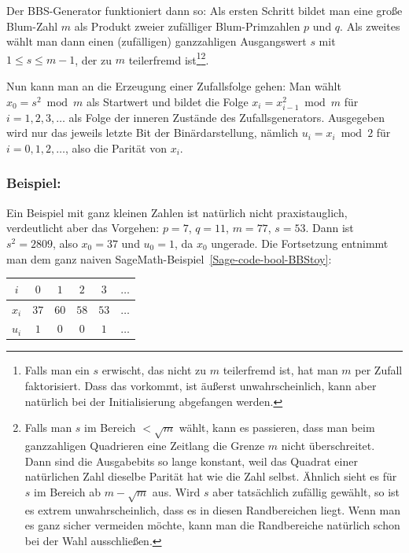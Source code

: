 \begin{refsegment}
Der BBS-Generator funktioniert dann so:
Als ersten Schritt bildet man eine große Blum-Zahl $m$ als Produkt
zweier zufälliger Blum-Primzahlen $p$ und $q$.
Als zweites wählt man dann einen (zufälligen) ganzzahligen Ausgangswert
$s$ mit $1 \leq s \leq m-1$, der zu $m$
teilerfremd ist\footnote{%
  Falls man ein $s$ erwischt, das nicht zu $m$ teilerfremd ist, hat
  man $m$ per Zufall faktorisiert. Dass das vorkommt, ist äußerst
  unwahrscheinlich, kann aber natürlich bei der Initialisierung
  abgefangen werden.
}\footnote{%
  Falls man $s$ im Bereich $< \sqrt{m}$ wählt, kann es passieren, dass
  man beim ganzzahligen Quadrieren eine Zeitlang die Grenze $m$ nicht
  überschreitet. Dann sind die Ausgabebits so lange konstant, weil
  das Quadrat einer natürlichen Zahl dieselbe Parität hat wie
  die Zahl selbst. Ähnlich sieht es für $s$ im Bereich ab
  $m - \sqrt{m}$ aus. Wird $s$ aber tatsächlich zufällig gewählt,
  so ist es extrem unwahrscheinlich, dass es in diesen
  Randbereichen liegt. Wenn man es ganz sicher vermeiden möchte,
  kann man die Randbereiche natürlich schon bei der Wahl ausschließen.
}.

Nun kann man an die Erzeugung einer Zufallsfolge gehen: Man wählt
$x_0 = s^2 \bmod m$ als Startwert und bildet die Folge
$x_i = x_{i-1}^2 \bmod m$ für $i = 1, 2, 3, \ldots$ als Folge der
inneren Zustände des Zufallsgenerators. Ausgegeben wird nur das jeweils
letzte Bit der Binärdarstellung, nämlich $u_i = x_i \bmod 2$ für
$i = 0, 1, 2, \ldots$, also die Parität von $x_i$.

\subsubsection*{Beispiel:}

Ein Beispiel mit ganz kleinen Zahlen ist natürlich nicht praxistauglich,
verdeutlicht aber das Vorgehen: $p = 7$, $q = 11$, $m = 77$,
$s = 53$. Dann ist $s^2 = 2809$, also
$x_0 = 37$ und $u_0 = 1$, da $x_0$ ungerade. Die Fortsetzung entnimmt
man dem ganz naiven SageMath-Beispiel~\ref{Sage-code-bool-BBStoy}:
\begin{center}
\begin{tabular}{|c|c|c|c|c|c|}
   \hline
   $i$   &  $0$ &  $1$ &  $2$ &  $3$ & $\ldots$ \\ \hline
   $x_i$ & $37$ & $60$ & $58$ & $53$ & $\ldots$ \\
   $u_i$ &  $1$ &  $0$ &  $0$ &  $1$ & $\ldots$ \\ \hline
\end{tabular}
\end{center}


\end{refsegment}
